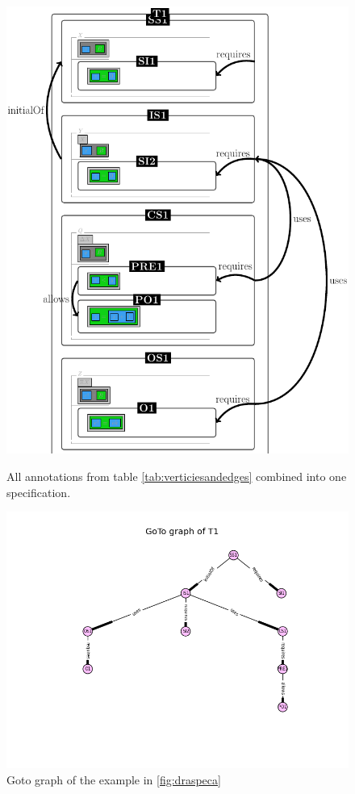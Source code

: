 \begin{figure}[H]
\centering
\begin{minipage}{0.35\textwidth}
\centering
\includegraphics[scale=0.18]{Figures/Formalising/draspec.png}
\caption{All annotations from table \ref{tab:verticiesandedges} combined into one specification.  \label{fig:draspeca}}
\end{minipage}\hfill
\begin{minipage}{0.6\textwidth}
\centering
\includegraphics[scale=0.5]{Figures/Formalising/goto_text.png}
\vspace{-1.1in}
\caption{Goto graph of the example in \ref{fig:draspeca} \label{fig:gotospecdep}}
\end{minipage}
\end{figure}

